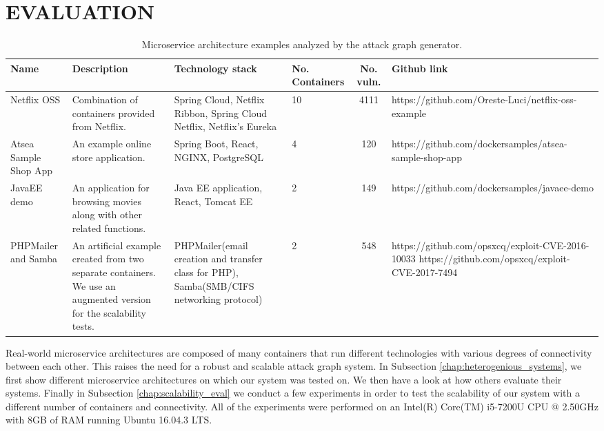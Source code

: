 
\section{EVALUATION}

\begin{table*}
	\begin{center}
		\begin{tabular}{ |p{20mm}|p{25mm}|p{20mm}|p{10mm}|c|p{60mm}| } 
			\hline
			Name & Description & Technology stack & No. Containers & No. vuln. & Github link \\\hline 
			
			Netflix OSS & Combination of containers provided from Netflix. & Spring Cloud, Netflix Ribbon, Spring Cloud Netflix, Netflix's Eureka & 10 & 4111 & https://github.com/Oreste-Luci/netflix-oss-example \\\hline
			
			Atsea Sample Shop App & An example online store application. & Spring Boot, React, NGINX, PostgreSQL & 4 & 120 &  https://github.com/dockersamples/atsea-sample-shop-app \\\hline
			
			JavaEE demo & An application for browsing movies along with other related functions. & Java EE application, React, Tomcat EE & 2 & 149 &  https://github.com/dockersamples/javaee-demo \\\hline
			
			PHPMailer and Samba & An artificial example created from two separate containers. We use an augmented version for the scalability tests. & PHPMailer(email creation and transfer class for PHP), Samba(SMB/CIFS networking protocol) & 2 & 548 &  https://github.com/opsxcq/exploit-CVE-2016-10033
			https://github.com/opsxcq/exploit-CVE-2017-7494 \\\hline
			
			
			\hline
		\end{tabular}
	\end{center}
	
	\caption{Microservice architecture examples analyzed by the attack graph generator.}
	\label{table_technologies}
	
\end{table*}

Real-world microservice architectures are composed of many containers that run different technologies with various degrees of connectivity between each other. This raises the need for a robust and scalable attack graph system. In Subsection \ref{chap:heterogenious_systems}, we first show different microservice architectures on which our system was tested on. We then have a look at how others evaluate their systems. Finally in Subsection \ref{chap:scalability_eval} we conduct a few experiments in order to test the scalability of our system with a different number of containers and connectivity. All of the experiments were performed on an Intel(R) Core(TM) i5-7200U CPU @ 2.50GHz with 8GB of RAM running Ubuntu 16.04.3 LTS.

